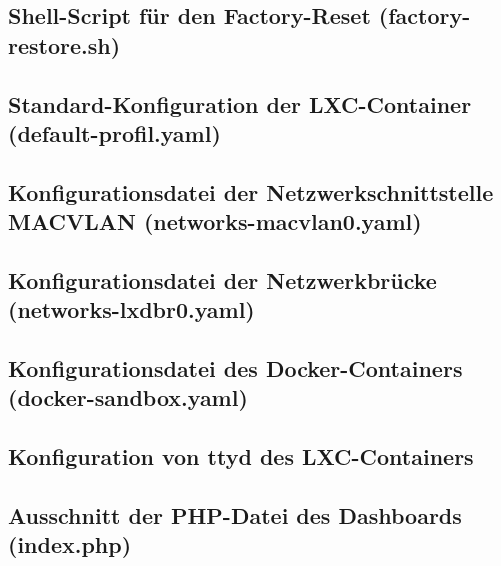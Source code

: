 \documentclass[11pt,
a4paper,
numbers=nonperiod,
footsepline,
oneside,
numbers=noenddot,
bibliography=totoc
]{scrartcl}
\begin{document}
\subsection{Shell-Script für den Factory-Reset (factory-restore.sh)} \label{sda2:shell}

\bigskip

\subsection{Standard-Konfiguration der LXC-Container (default-profil.yaml)} \label{default-profil-yaml}
\bigskip

\subsection{Konfigurationsdatei der Netzwerkschnittstelle MACVLAN (networks-macvlan0.yaml)} \label{macvlan-yaml}
\bigskip

\subsection{Konfigurationsdatei der Netzwerkbrücke (networks-lxdbr0.yaml)} \label{netbr-yaml}
\bigskip

\subsection{Konfigurationsdatei des Docker-Containers (docker-sandbox.yaml)} \label{docker-yaml}
\bigskip
\newpage
\subsection{Konfiguration von ttyd des LXC-Containers} \label{sda3:ttyd-docker}

\bigskip

\subsection{Ausschnitt der PHP-Datei des Dashboards (index.php)} \label{app:php_code}

\bigskip
\end{document}
